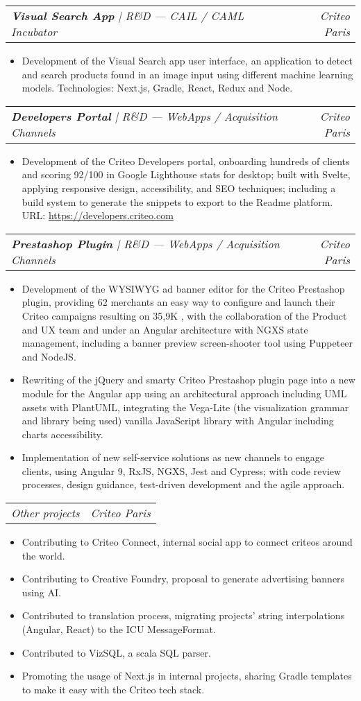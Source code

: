 \documentclass[letterpaper,11pt]{article}
\makeatletter
\newcommand{\resumeItem}[1]{
  \item\small{
    {#1 \vspace{-2pt}}
  }
}
\newcommand{\resumeSubSubheading}[2]{
    \vspace{-2pt}\item
    \begin{tabular*}{0.97\textwidth}{l@{\extracolsep{\fill}}r}
      \textit{\small#1} & \textit{\small #2} \\
    \end{tabular*}\vspace{-7pt}
}
\newcommand{\resumeItemListStart}{\begin{itemize}}
\newcommand{\resumeItemListEnd}{\end{itemize}\vspace{-5pt}}
\makeatother
\begin{document}
      \resumeSubSubheading{\textbf{Visual Search App} | R\&D --- CAIL / CAML Incubator }{Criteo Paris}
        \resumeItemListStart
          \resumeItem{Development of the Visual Search app user interface, an application to detect and search products found in an image input using different machine learning models. Technologies: Next.js, Gradle, React, Redux and Node.}
          \resumeItemListEnd

      \resumeSubSubheading{\textbf{Developers Portal} | R\&D --- WebApps / Acquisition Channels}{Criteo Paris}
      \resumeItemListStart
        \resumeItem{Development of the Criteo Developers portal, onboarding hundreds of clients and scoring 92/100 in Google Lighthouse stats for desktop; built with Svelte, applying responsive design, accessibility, and SEO techniques; including a build system to generate the snippets to export to the Readme platform.
        \\[1.5pt]
        URL: {\href{https://developers.criteo.com}{\color{blue}https://developers.criteo.com}}
        }
      \resumeItemListEnd

      \resumeSubSubheading{\textbf{Prestashop Plugin} | R\&D --- WebApps / Acquisition Channels}{Criteo Paris}
      \resumeItemListStart
        \resumeItem{Development of the WYSIWYG ad banner editor for the Criteo Prestashop plugin, providing 62 merchants an easy way to configure and launch their Criteo campaigns resulting on 35,9K , with the collaboration of the Product and UX team and under an Angular architecture with NGXS state management, including a banner preview screen-shooter tool using Puppeteer and NodeJS.}
        \resumeItem{Rewriting of the jQuery and smarty Criteo Prestashop plugin page into a new module for the Angular app using an architectural approach including UML assets with PlantUML, integrating the Vega-Lite (the visualization grammar and library being used) vanilla JavaScript library with Angular including charts accessibility.}
        \resumeItem{Implementation of new self-service solutions as new channels to engage clients, using Angular 9, RxJS, NGXS, Jest and Cypress; with code review processes, design guidance, test-driven development and the agile approach.}
      \resumeItemListEnd

      \resumeSubSubheading{Other projects}{Criteo Paris}
        \resumeItemListStart
          \resumeItem{Contributing to Criteo Connect, internal social app to connect criteos around the world.}
          \resumeItem{Contributing to Creative Foundry, proposal to generate advertising banners using AI.}
          \resumeItem{Contributed to translation process, migrating projects' string interpolations (Angular, React) to the ICU MessageFormat.}
          \resumeItem{Contributed to VizSQL, a scala SQL parser.}
          \resumeItem{Promoting the usage of Next.js in internal projects, sharing Gradle templates to make it easy with the Criteo tech stack.}
        \resumeItemListEnd
\end{document}
